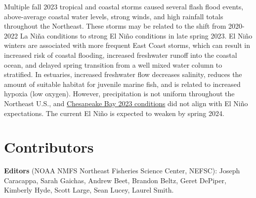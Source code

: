 \documentclass[
  10pt,
]{article}
\begin{document}
Multiple fall 2023 tropical and coastal storms caused several flash flood events, above-average coastal water levels, strong winds, and high rainfall totals throughout the Northeast. These storms may be related to the shift from 2020-2022 La Niña conditions to strong El Niño conditions in late spring 2023. El Niño winters are associated with more frequent East Coast storms, which can result in increased risk of coastal flooding, increased freshwater runoff into the coastal ocean, and delayed spring transition from a well mixed water column to stratified. In estuaries, increased freshwater flow decreases salinity, reduces the amount of suitable habitat for juvenile marine fish, and is related to increased hypoxia (low oxygen). However, precipitation is not uniform throughout the Northeast U.S., and \href{https://noaa-edab.github.io/catalog/ch_bay_sal.html}{Chesapeake Bay 2023 conditions} did not align with El Niño expectations. The current El Niño is expected to weaken by spring 2024.

\hypertarget{contributors}{%
\section{Contributors}\label{contributors}}

\textbf{Editors} (NOAA NMFS Northeast Fisheries Science Center, NEFSC): Joseph Caracappa, Sarah Gaichas, Andrew Beet, Brandon Beltz, Geret DePiper, Kimberly Hyde, Scott Large, Sean Lucey, Laurel Smith.
\end{document}
